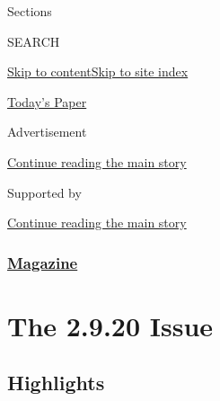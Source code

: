 Sections

SEARCH

\protect\hyperlink{site-content}{Skip to
content}\protect\hyperlink{site-index}{Skip to site index}

\href{https://myaccount.nytimes3xbfgragh.onion/auth/login?response_type=cookie\&client_id=vi}{}

\href{https://www.nytimes3xbfgragh.onion/section/todayspaper}{Today's
Paper}

Advertisement

\protect\hyperlink{after-top}{Continue reading the main story}

Supported by

\protect\hyperlink{after-sponsor}{Continue reading the main story}

\hypertarget{magazine}{%
\subsubsection{\texorpdfstring{\href{/section/magazine}{Magazine}}{Magazine}}\label{magazine}}

\hypertarget{the-2920-issue}{%
\section{The 2.9.20 Issue}\label{the-2920-issue}}

\hypertarget{highlights}{%
\subsection{Highlights}\label{highlights}}

